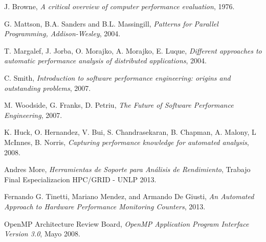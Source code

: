 \documentclass[a4paper]{article}
\begin{document}
\begin{thebibliography}{9}
  
 J. Browne,
 \emph{A critical overview of computer performance evaluation},
 1976.

 G. Mattson, B.A. Sanders and B.L. Massingill, 
 \emph{Patterns for Parallel Programming, Addison-Wesley},
 2004.

 T. Margalef, J. Jorba, O. Morajko, A. Morajko, E. Luque,
 \emph{Different approaches to automatic performance analysis of distributed applications},
 2004.

 C. Smith,
 \emph{Introduction to software performance engineering: origins and outstanding problems},
 2007.

 M. Woodside, G. Franks, D. Petriu,
 \emph{The Future of Software Performance Engineering},
 2007.

 K. Huck, O. Hernandez, V. Bui, S. Chandrasekaran, B. Chapman, A. Malony, L McInnes, B. Norris,
 \emph{Capturing performance knowledge for automated analysis},
 2008.

  Andres More,
 \emph{Herramientas de Soporte para Análisis de Rendimiento},
 Trabajo Final Especializacion HPC/GRID - UNLP 2013.

  Fernando G. Tinetti, Mariano Mendez, and Armando De Giusti,
  \emph{An Automated Approach to Hardware Performance Monitoring Counters},
  2013. 

  OpenMP Architecture Review Board,
  \emph{OpenMP Application Program Interface Version 3.0},
  Mayo 2008.

\end{thebibliography}
\end{document}
